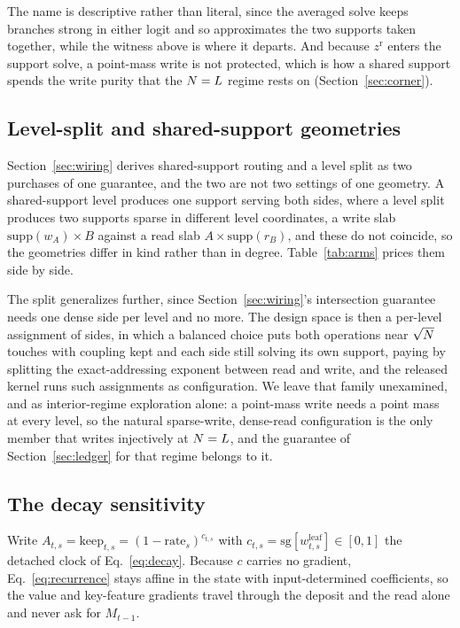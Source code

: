 The name is descriptive rather than literal, since the averaged solve keeps branches strong in either logit and so approximates the two supports taken together, while the witness above is where it departs. And because $z^{\mathrm{r}}$ enters the support solve, a point-mass write is not protected, which is how a shared support spends the write purity that the $N = L$ regime rests on (Section~\ref{sec:corner}).

\subsection{Level-split and shared-support geometries}

Section~\ref{sec:wiring} derives shared-support routing and a level split as two purchases of one guarantee, and the two are not two settings of one geometry. A shared-support level produces one support serving both sides, where a level split produces two supports sparse in different level coordinates, a write slab $\mathrm{supp}(w_A) \times B$ against a read slab $A \times \mathrm{supp}(r_B)$, and these do not coincide, so the geometries differ in kind rather than in degree. Table~\ref{tab:arms} prices them side by side.

The split generalizes further, since Section~\ref{sec:wiring}'s intersection guarantee needs one dense side per level and no more. The design space is then a per-level assignment of sides, in which a balanced choice puts both operations near $\sqrt{N}$ touches with coupling kept and each side still solving its own support, paying by splitting the exact-addressing exponent between read and write, and the released kernel runs such assignments as configuration. We leave that family unexamined, and as interior-regime exploration alone: a point-mass write needs a point mass at every level, so the natural sparse-write, dense-read configuration is the only member that writes injectively at $N = L$, and the guarantee of Section~\ref{sec:ledger} for that regime belongs to it.

\subsection{The decay sensitivity}

Write $A_{t,s} = \mathrm{keep}_{t,s} = (1 - \mathrm{rate}_s)^{c_{t,s}}$ with $c_{t,s} = \mathrm{sg}[w^{\mathrm{leaf}}_{t,s}] \in [0,1]$ the detached clock of Eq.~\eqref{eq:decay}. Because $c$ carries no gradient, Eq.~\eqref{eq:recurrence} stays affine in the state with input-determined coefficients, so the value and key-feature gradients travel through the deposit and the read alone and never ask for $M_{t-1}$.

